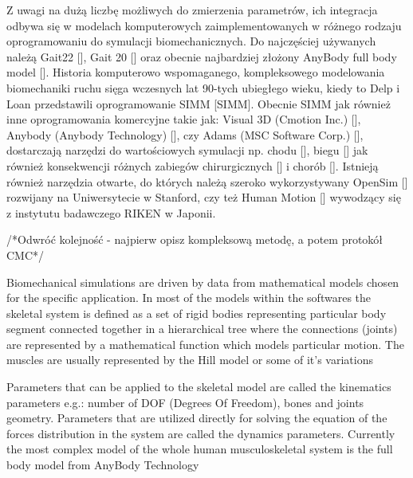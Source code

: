 Z uwagi na dużą liczbę możliwych do zmierzenia parametrów, ich integracja odbywa się w modelach komputerowych zaimplementowanych w różnego rodzaju oprogramowaniu do symulacji biomechanicznych. Do najczęściej używanych należą Gait22 [], Gait 20 [] oraz obecnie najbardziej złożony AnyBody full body model []. Historia komputerowo wspomaganego, kompleksowego modelowania biomechaniki ruchu sięga wczesnych lat 90-tych ubiegłego wieku, kiedy to Delp i Loan przedstawili oprogramowanie SIMM [SIMM]. Obecnie SIMM jak również inne oprogramowania komercyjne takie jak: Visual 3D (Cmotion Inc.) [], Anybody (Anybody Technology) [], czy Adams (MSC Software Corp.) [], dostarczają narzędzi do wartościowych symulacji np. chodu [], biegu [] jak również konsekwencji różnych zabiegów chirurgicznych [] i chorób []. Istnieją również narzędzia otwarte, do których należą szeroko wykorzystywany OpenSim [] rozwijany na Uniwersytecie w Stanford, czy też Human Motion [] wywodzący się z instytutu badawczego RIKEN w Japonii.

/*Odwróć kolejność - najpierw opisz kompleksową metodę, a potem protokół CMC*/

Biomechanical simulations are driven by data from mathematical models chosen for the specific application. In most of the models within the softwares the skeletal system is defined as a set of rigid bodies representing particular body segment connected together in a hierarchical tree where the connections (joints) are represented by a mathematical function which models particular motion. The muscles are usually represented by the Hill model or some of it’s variations \cite{}

Parameters that can be applied to the skeletal model are called the kinematics parameters e.g.: number of DOF (Degrees Of Freedom), bones and joints geometry. Parameters that are utilized directly for solving the equation of the forces distribution in the system are called the dynamics parameters. Currently the most complex model of the whole human musculoskeletal system is the full body model from AnyBody Technology \cite{}

 

